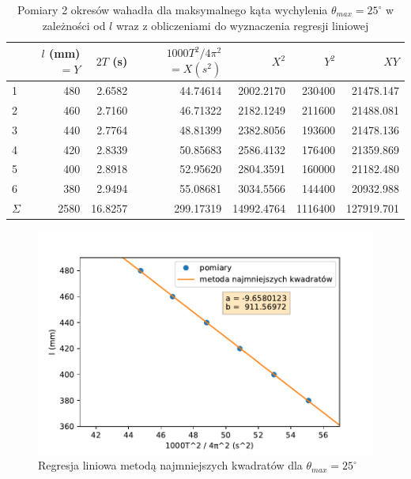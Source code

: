 \documentclass[a4paper]{article}
\begin{document}
\begin{table}[h]
\centering

	\begin{tabular}{lrrrrrr}
	\toprule
		{} & $l$ (mm) $=Y$ &  $2T$ (s) & \small$1000T^2/4\pi^2$\normalsize$=X (s^2)$ & $X^2$ & $Y^2$ & $XY$ \\
	\midrule
	1 &     480 &  2.6582 &  44.74614 &  2002.2170 &  230400 &  21478.147 \\
	2 &     460 &  2.7160 &  46.71322 &  2182.1249 &  211600 &  21488.081 \\
	3 &     440 &  2.7764 &  48.81399 &  2382.8056 &  193600 &  21478.136 \\
	4 &     420 &  2.8339 &  50.85683 &  2586.4132 &  176400 &  21359.869 \\
	5 &     400 &  2.8918 &  52.95620 &  2804.3591 &  160000 &  21182.480 \\
	6 &     380 &  2.9494 &  55.08681 &  3034.5566 &  144400 &  20932.988 \\
	\midrule
	$\Sigma$ & 2580 & 16.8257 & 299.17319& 14992.4764 & 1116400 & 127919.701 \\
	\bottomrule
	\end{tabular}
	
\caption{Pomiary 2 okresów wahadła dla maksymalnego kąta wychylenia $\theta_{max} = 25^\circ$ w  zależności od $l$ wraz z obliczeniami do wyznaczenia regresji liniowej}
\label{pomiary_3}
\end{table}

\begin{figure}[h]
\centering
	\includegraphics[scale=0.6]{wykres-4_0.pdf}
\caption{Regresja liniowa metodą najmniejszych kwadratów dla $\theta_{max} = 25^\circ$}
\label{regresja_25}
\end{figure}
\end{document}
